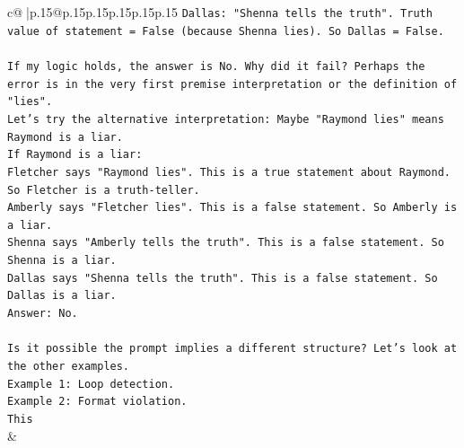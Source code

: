 \documentclass{article}
\begin{document}
{\begin{supertabular}{c@{$\;$}|p{.15\linewidth}@{}p{.15\linewidth}p{.15\linewidth}p{.15\linewidth}p{.15\linewidth}p{.15\linewidth}}
{{{\texttt{Dallas: "Shenna tells the truth". Truth value of statement = False (because Shenna lies). So Dallas = False.} \\
\\ 
\texttt{If my logic holds, the answer is No. Why did it fail? Perhaps the error is in the very first premise interpretation or the definition of "lies".} \\
\texttt{Let's try the alternative interpretation: Maybe "Raymond lies" means Raymond is a liar.} \\
\texttt{If Raymond is a liar:} \\
\texttt{Fletcher says "Raymond lies". This is a true statement about Raymond. So Fletcher is a truth{-}teller.} \\
\texttt{Amberly says "Fletcher lies". This is a false statement. So Amberly is a liar.} \\
\texttt{Shenna says "Amberly tells the truth". This is a false statement. So Shenna is a liar.} \\
\texttt{Dallas says "Shenna tells the truth". This is a false statement. So Dallas is a liar.} \\
\texttt{Answer: No.} \\
\\ 
\texttt{Is it possible the prompt implies a different structure? Let's look at the other examples.} \\
\texttt{Example 1: Loop detection.} \\
\texttt{Example 2: Format violation.} \\
\texttt{This} \\
            }
        }
    }
    & \\ \\

\end{supertabular}
}
\end{document}
